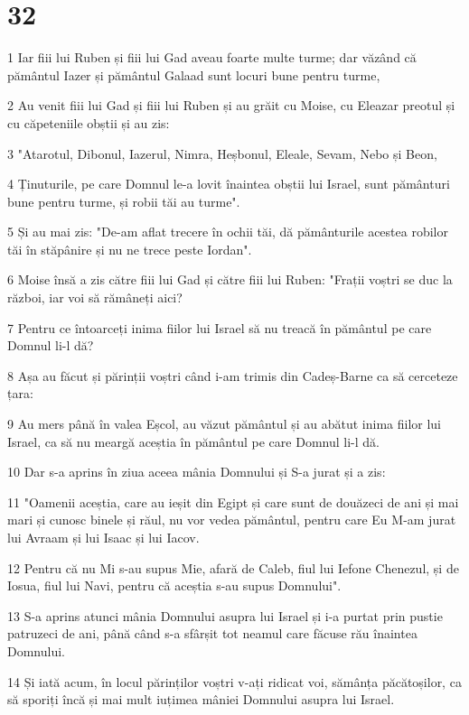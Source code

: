 \chapter{32}

\par 1 Iar fiii lui Ruben și fiii lui Gad aveau foarte multe turme; dar văzând că pământul Iazer și pământul Galaad sunt locuri bune pentru turme,
\par 2 Au venit fiii lui Gad și fiii lui Ruben și au grăit cu Moise, cu Eleazar preotul și cu căpeteniile obștii și au zis:
\par 3 "Atarotul, Dibonul, Iazerul, Nimra, Heșbonul, Eleale, Sevam, Nebo și Beon,
\par 4 Ținuturile, pe care Domnul le-a lovit înaintea obștii lui Israel, sunt pământuri bune pentru turme, și robii tăi au turme".
\par 5 Și au mai zis: "De-am aflat trecere în ochii tăi, dă pământurile acestea robilor tăi în stăpânire și nu ne trece peste Iordan".
\par 6 Moise însă a zis către fiii lui Gad și către fiii lui Ruben: "Frații voștri se duc la război, iar voi să rămâneți aici?
\par 7 Pentru ce întoarceți inima fiilor lui Israel să nu treacă în pământul pe care Domnul li-l dă?
\par 8 Așa au făcut și părinții voștri când i-am trimis din Cadeș-Barne ca să cerceteze țara:
\par 9 Au mers până în valea Eșcol, au văzut pământul și au abătut inima fiilor lui Israel, ca să nu meargă aceștia în pământul pe care Domnul li-l dă.
\par 10 Dar s-a aprins în ziua aceea mânia Domnului și S-a jurat și a zis:
\par 11 "Oamenii aceștia, care au ieșit din Egipt și care sunt de douăzeci de ani și mai mari și cunosc binele și răul, nu vor vedea pământul, pentru care Eu M-am jurat lui Avraam și lui Isaac și lui Iacov.
\par 12 Pentru că nu Mi s-au supus Mie, afară de Caleb, fiul lui Iefone Chenezul, și de Iosua, fiul lui Navi, pentru că aceștia s-au supus Domnului".
\par 13 S-a aprins atunci mânia Domnului asupra lui Israel și i-a purtat prin pustie patruzeci de ani, până când s-a sfârșit tot neamul care făcuse rău înaintea Domnului.
\par 14 Și iată acum, în locul părinților voștri v-ați ridicat voi, sămânța păcătoșilor, ca să sporiți încă și mai mult iuțimea mâniei Domnului asupra lui Israel.
